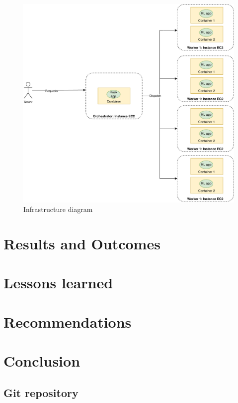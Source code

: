 \documentclass[letterpaper,headings=standardclasses,parskip=half]{scrartcl}
\newcommand{\todo}{{\color{red}{TODO}}}
\begin{document}
\begin{figure}
    \centering
    \includegraphics[width=\textwidth]{images/infra.pdf}
    \caption{Infrastructure diagram}
    \label{fig:infra}
\end{figure}


\section{Results and Outcomes}

\todo

\section{Lessons learned}

\todo

\section{Recommendations}

\todo

\section{Conclusion}

\todo


\subsection*{Git repository}
\end{document}
